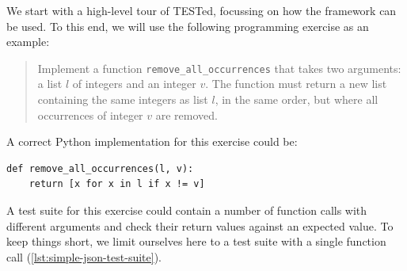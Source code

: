 \documentclass[../main]{subfiles}
\begin{document}
We start with a high-level tour of TESTed, focussing on how the framework can be used.
To this end, we will use the following programming exercise as an example:

\begin{quote}
    Implement a function \texttt{remove\_all\_occurrences} that takes two arguments: a list $l$ of integers and an integer $v$.
    The function must return a new list containing the same integers as list $l$, in the same order, but where all occurrences of integer $v$ are removed.
\end{quote}

A correct Python implementation for this exercise could be:

\begin{verbatim}
def remove_all_occurrences(l, v):
    return [x for x in l if x != v]
\end{verbatim}

A test suite for this exercise could contain a number of function calls with different arguments and check their return values against an expected value.
To keep things short, we limit ourselves here to a test suite with a single function call (\cref{lst:simple-json-test-suite}).

\end{document}

